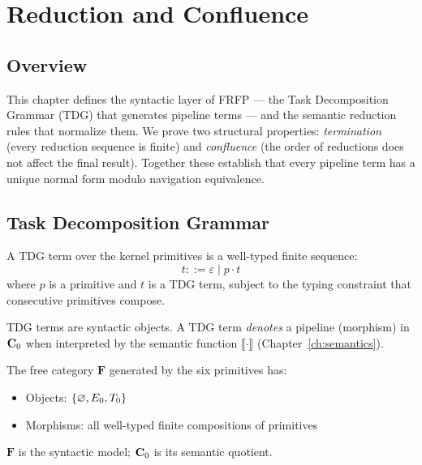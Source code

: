\section{Reduction and Confluence}
\label{ch:reduction}

\subsection{Overview}

This chapter defines the syntactic layer of FRFP --- the Task Decomposition Grammar
(TDG) that generates pipeline terms --- and the semantic reduction rules that
normalize them. We prove two structural properties: \emph{termination} (every
reduction sequence is finite) and \emph{confluence} (the order of reductions does
not affect the final result). Together these establish that every pipeline term
has a unique normal form modulo navigation equivalence.

\subsection{Task Decomposition Grammar}

\begin{definition}
A TDG term over the kernel primitives is a well-typed finite sequence:
\[
  t ::= \varepsilon \mid p \cdot t
\]
where $p$ is a primitive and $t$ is a TDG term, subject to the typing
constraint that consecutive primitives compose.

TDG terms are syntactic objects. A TDG term \emph{denotes} a pipeline (morphism)
in $\mathbf{C}_0$ when interpreted by the semantic function $\llbracket \cdot \rrbracket$
(Chapter~\ref{ch:semantics}).
\end{definition}

\begin{definition}
The free category $\mathbf{F}$ generated by the six primitives has:
\begin{itemize}
  \item Objects: $\{\varnothing, E_0, T_0\}$
  \item Morphisms: all well-typed finite compositions of primitives
\end{itemize}
$\mathbf{F}$ is the syntactic model; $\mathbf{C}_0$ is its semantic quotient.
\end{definition}

